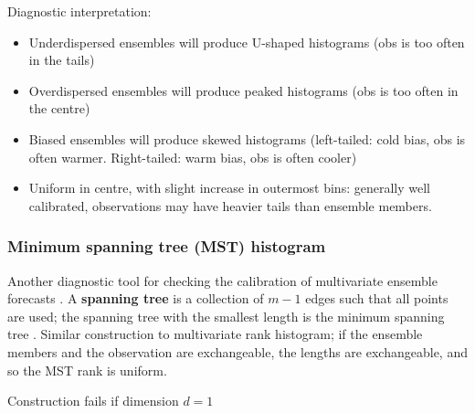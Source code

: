 \documentclass[10pt,fleqn]{article}
\begin{document}
Diagnostic interpretation:
%
\begin{itemize}

\item Underdispersed ensembles will produce U-shaped histograms (obs is too often in the tails)

\item Overdispersed ensembles will produce peaked histograms (obs is too often in the centre)

\item Biased ensembles will produce skewed histograms (left-tailed: cold bias, obs is often warmer. Right-tailed: warm bias, obs is often cooler)

\item Uniform in centre, with slight increase in outermost bins: generally well calibrated, observations may have heavier tails than ensemble members.
\end{itemize}

\subsubsection*{Minimum spanning tree (MST) histogram}

Another diagnostic tool for checking the calibration of multivariate ensemble forecasts \cite{Smith2001}. A \textbf{spanning tree} is a collection of $m-1$ edges such that all points are used; the spanning tree with the smallest length is the minimum spanning tree \cite{Kruskal1956}. Similar construction to multivariate rank histogram; if the ensemble members and the observation are exchangeable, the lengths are exchangeable, and so the MST rank is uniform. 

Construction fails if dimension $d=1$
\end{document}
